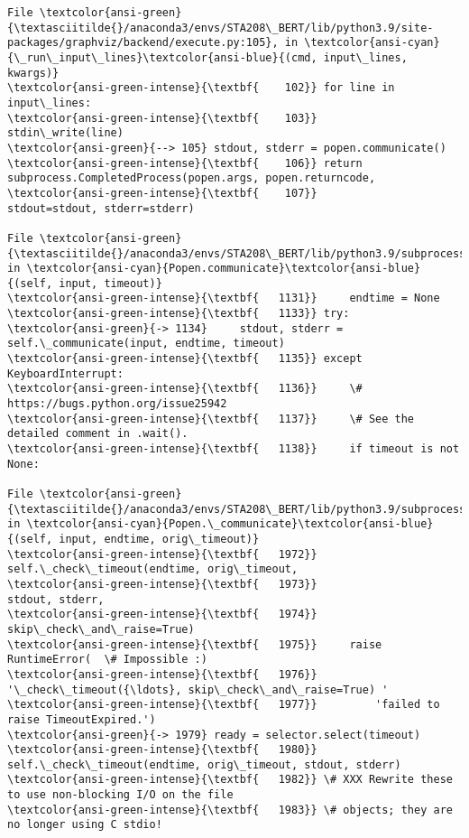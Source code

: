 \documentclass[11pt]{article}
\begin{document}
\begin{Verbatim}[commandchars=\\\{\}, frame=single, framerule=2mm, rulecolor=\color{outerrorbackground}]
File \textcolor{ansi-green}{\textasciitilde{}/anaconda3/envs/STA208\_BERT/lib/python3.9/site-packages/graphviz/backend/execute.py:105}, in \textcolor{ansi-cyan}{\_run\_input\_lines}\textcolor{ansi-blue}{(cmd, input\_lines, kwargs)}
\textcolor{ansi-green-intense}{\textbf{    102}} for line in input\_lines:
\textcolor{ansi-green-intense}{\textbf{    103}}     stdin\_write(line)
\textcolor{ansi-green}{--> 105} stdout, stderr = popen.communicate()
\textcolor{ansi-green-intense}{\textbf{    106}} return subprocess.CompletedProcess(popen.args, popen.returncode,
\textcolor{ansi-green-intense}{\textbf{    107}}                                    stdout=stdout, stderr=stderr)

File \textcolor{ansi-green}{\textasciitilde{}/anaconda3/envs/STA208\_BERT/lib/python3.9/subprocess.py:1134}, in \textcolor{ansi-cyan}{Popen.communicate}\textcolor{ansi-blue}{(self, input, timeout)}
\textcolor{ansi-green-intense}{\textbf{   1131}}     endtime = None
\textcolor{ansi-green-intense}{\textbf{   1133}} try:
\textcolor{ansi-green}{-> 1134}     stdout, stderr = self.\_communicate(input, endtime, timeout)
\textcolor{ansi-green-intense}{\textbf{   1135}} except KeyboardInterrupt:
\textcolor{ansi-green-intense}{\textbf{   1136}}     \# https://bugs.python.org/issue25942
\textcolor{ansi-green-intense}{\textbf{   1137}}     \# See the detailed comment in .wait().
\textcolor{ansi-green-intense}{\textbf{   1138}}     if timeout is not None:

File \textcolor{ansi-green}{\textasciitilde{}/anaconda3/envs/STA208\_BERT/lib/python3.9/subprocess.py:1979}, in \textcolor{ansi-cyan}{Popen.\_communicate}\textcolor{ansi-blue}{(self, input, endtime, orig\_timeout)}
\textcolor{ansi-green-intense}{\textbf{   1972}}     self.\_check\_timeout(endtime, orig\_timeout,
\textcolor{ansi-green-intense}{\textbf{   1973}}                         stdout, stderr,
\textcolor{ansi-green-intense}{\textbf{   1974}}                         skip\_check\_and\_raise=True)
\textcolor{ansi-green-intense}{\textbf{   1975}}     raise RuntimeError(  \# Impossible :)
\textcolor{ansi-green-intense}{\textbf{   1976}}         '\_check\_timeout({\ldots}, skip\_check\_and\_raise=True) '
\textcolor{ansi-green-intense}{\textbf{   1977}}         'failed to raise TimeoutExpired.')
\textcolor{ansi-green}{-> 1979} ready = selector.select(timeout)
\textcolor{ansi-green-intense}{\textbf{   1980}} self.\_check\_timeout(endtime, orig\_timeout, stdout, stderr)
\textcolor{ansi-green-intense}{\textbf{   1982}} \# XXX Rewrite these to use non-blocking I/O on the file
\textcolor{ansi-green-intense}{\textbf{   1983}} \# objects; they are no longer using C stdio!


\end{Verbatim}
\end{document}
